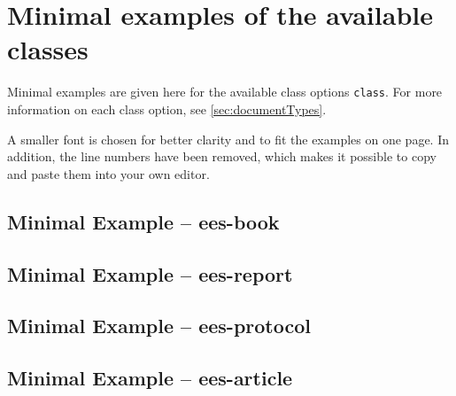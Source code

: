 
\section{Minimal examples of the available classes}
\label{app:samples}
Minimal examples are given here for the available class options \texttt{class}. For more information on each class option, see \autoref{sec:documentTypes}. 

A smaller font is chosen for better clarity and to fit the examples on one page. In addition, the line numbers have been removed, which makes it possible to copy and paste them into your own editor.


\clearpage
\subsection{Minimal Example -- ees-book}
\label{sec:app:samples:book}



\clearpage
\subsection{Minimal Example -- ees-report}
\label{sec:app:samples:report}




\clearpage
\subsection{Minimal Example -- ees-protocol}
\label{sec:app:samples:protocol}




\clearpage
\subsection{Minimal Example -- ees-article}
\label{sec:app:samples:article}

